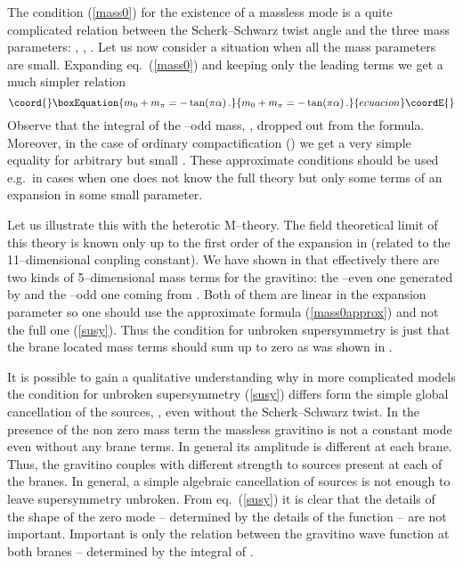 \documentclass[a4paper,12pt]{article}
\def\ka{\kappa}
\def\al{\alpha}
\def\ZZ{\mathbb Z}
\begin{document}
The condition (\ref{mass0}) for the existence of a massless mode is a
quite complicated relation between the Scherk--Schwarz twist angle
and the three mass parameters: \coordHE{}, \coordHE{}, \coordHE{}. Let us now
consider a situation when all the mass parameters are small. Expanding
eq.\ (\ref{mass0}) and keeping only the leading terms we get a much
simpler relation 
\begin{equation}\coord{}\boxEquation{
m_0+m_\pi=-\tan(\pi\al)
\,.
\label{mass0approx}
}{
m_0+m_\pi=-\tan(\pi\al)
\,.
}{ecuacion}\coordE{}\end{equation}
Observe that the integral of the \myHighlight{$\ZZ_2$}\coordHE{}--odd mass, \coordHE{}, dropped out
from the formula. Moreover, in the case of ordinary compactification
(\myHighlight{$\al=0$}\coordHE{}) we get a very simple equality \coordHE{} for arbitrary but
small \coordHE{}. These approximate conditions should be used e.g.\ in
cases when one does not know the full theory but only some terms of an
expansion in some small parameter.


Let us illustrate this with the heterotic M--theory. The field
theoretical limit of this theory is known only up to the first order
of the expansion in \myHighlight{$\ka^{2/3}$}\coordHE{} (related to the 11--dimensional
coupling constant). We have shown in \cite{Meissner:1999ja} that
effectively there are two kinds of 5--dimensional mass terms for the 
gravitino: the \myHighlight{$\ZZ_2$}\coordHE{}--even one generated by \coordHE{}
and the \myHighlight{$\ZZ_2$}\coordHE{}--odd one coming from 
\coordHE{}. Both of them are linear in the
expansion parameter \myHighlight{$\ka^{2/3}$}\coordHE{} so one should use the approximate
formula (\ref{mass0approx}) and not the full one (\ref{susy}).
Thus the condition for unbroken supersymmetry is just that the brane
located mass terms should sum up to zero as was shown in
\cite{Meissner:1999ja}. 


It is possible to gain a qualitative understanding why in more
complicated models the condition for unbroken supersymmetry
(\ref{susy}) differs form the simple global cancellation of the
sources, \coordHE{}, even without the Scherk--Schwarz twist.  
In the presence of the non zero mass term \coordHE{} the massless gravitino
is not a constant mode even without any brane terms. In general its
amplitude is different at each brane. Thus, the gravitino 
couples with different strength to sources present at each of the
branes. In general, a simple algebraic cancellation of sources is not
enough to leave supersymmetry unbroken. From eq.\ (\ref{susy}) it is
clear that the details of the shape of the zero mode -- determined by
the details of the function \coordHE{} -- are not important. Important
is only the relation between the gravitino wave function at both
branes -- determined by the integral of \coordHE{}.
\end{document}
